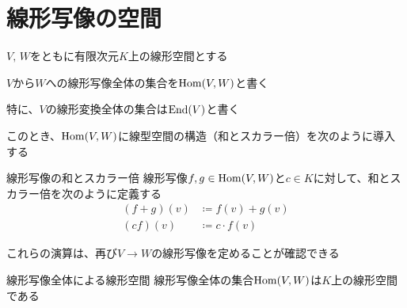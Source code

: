 \documentclass[../../../topic_linear-algebra]{subfiles}
\begin{document}
\sectionline
\section{線形写像の空間}

$V,\,W$をともに有限次元$K$上の線形空間とする

\br

$V$から$W$への線形写像全体の集合を$\operatorname{Hom}(V,W)$と書く

特に、$V$の線形変換全体の集合は$\operatorname{End}(V)$と書く

\br

このとき、$\operatorname{Hom}(V,W)$に線型空間の構造（和とスカラー倍）を次のように導入する

\begin{definition}{線形写像の和とスカラー倍}
  線形写像$f,g\in\operatorname{Hom}(V,W)$と$c\in K$に対して、和とスカラー倍を次のように定義する
  \begin{align*}
    (f+g)(v) & \coloneq f(v) + g(v) \\
    (cf)(v)  & \coloneq c\cdot f(v)
  \end{align*}
\end{definition}

\br

これらの演算は、再び$V \to W$の線形写像を定めることが確認できる

\begin{theorem}{線形写像全体による線形空間}
  線形写像全体の集合$\operatorname{Hom}(V,W)$は$K$上の線形空間である
\end{theorem}
\end{document}
